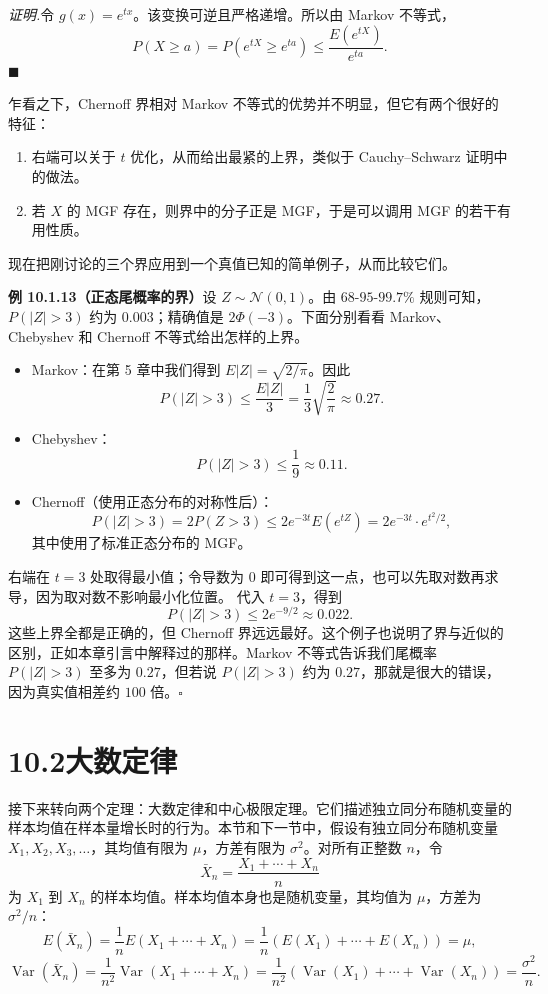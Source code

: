 \documentclass[UTF8,12pt,a4paper,fontset=fandol]{ctexart}
\begin{document}
\noindent\textit{证明.}\quad 令 $g(x)=e^{tx}$。该变换可逆且严格递增。所以由 Markov 不等式，
\[
  P(X\ge a)=P(e^{tX}\ge e^{ta})\le \frac{E(e^{tX})}{e^{ta}}.
\]
$\blacksquare$

乍看之下，Chernoff 界相对 Markov 不等式的优势并不明显，但它有两个很好的特征：
\begin{enumerate}
  \item 右端可以关于 $t$ 优化，从而给出最紧的上界，类似于 Cauchy--Schwarz 证明中的做法。
  \item 若 $X$ 的 MGF 存在，则界中的分子正是 MGF，于是可以调用 MGF 的若干有用性质。
\end{enumerate}

现在把刚讨论的三个界应用到一个真值已知的简单例子，从而比较它们。

\noindent\textbf{例 10.1.13（正态尾概率的界）}\quad 设 $Z\sim\mathcal N(0,1)$。由 $68$-$95$-$99.7\%$ 规则可知，$P(|Z|>3)$ 约为 $0.003$；精确值是 $2\Phi(-3)$。下面分别看看 Markov、Chebyshev 和 Chernoff 不等式给出怎样的上界。

\begin{itemize}
  \item Markov：在第 5 章中我们得到 $E|Z|=\sqrt{2/\pi}$。因此
  \[
    P(|Z|>3)\le \frac{E|Z|}{3}
    =\frac13\sqrt{\frac2\pi}\approx 0.27.
  \]

  \item Chebyshev：
  \[
    P(|Z|>3)\le \frac19\approx 0.11.
  \]

  \item Chernoff（使用正态分布的对称性后）：
  \[
    P(|Z|>3)=2P(Z>3)\le 2e^{-3t}E(e^{tZ})
    =2e^{-3t}\cdot e^{t^2/2},
  \]
  其中使用了标准正态分布的 MGF。
\end{itemize}

右端在 $t=3$ 处取得最小值；令导数为 $0$ 即可得到这一点，也可以先取对数再求导，因为取对数不影响最小化位置。
代入 $t=3$，得到
\[
  P(|Z|>3)\le 2e^{-9/2}\approx 0.022.
\]
这些上界全都是正确的，但 Chernoff 界远远最好。这个例子也说明了界与近似的区别，正如本章引言中解释过的那样。Markov 不等式告诉我们尾概率 $P(|Z|>3)$ 至多为 $0.27$，但若说 $P(|Z|>3)$ 约为 $0.27$，那就是很大的错误，因为真实值相差约 $100$ 倍。$\square$

\section*{10.2\quad 大数定律}

接下来转向两个定理：大数定律和中心极限定理。它们描述独立同分布随机变量的样本均值在样本量增长时的行为。本节和下一节中，假设有独立同分布随机变量 $X_1,X_2,X_3,\ldots$，其均值有限为 $\mu$，方差有限为 $\sigma^2$。对所有正整数 $n$，令
\[
  \bar X_n=\frac{X_1+\cdots+X_n}{n}
\]
为 $X_1$ 到 $X_n$ 的样本均值。样本均值本身也是随机变量，其均值为 $\mu$，方差为 $\sigma^2/n$：
\[
  E(\bar X_n)=\frac1nE(X_1+\cdots+X_n)
  =\frac1n(E(X_1)+\cdots+E(X_n))=\mu,
\]
\[
  \operatorname{Var}(\bar X_n)
  =\frac1{n^2}\operatorname{Var}(X_1+\cdots+X_n)
  =\frac1{n^2}(\operatorname{Var}(X_1)+\cdots+\operatorname{Var}(X_n))
  =\frac{\sigma^2}{n}.
\]
\end{document}
